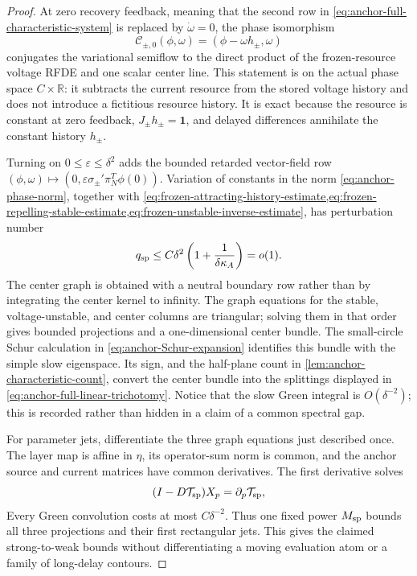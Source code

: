 \begin{proof}
At zero recovery feedback, meaning that the second row in
\cref{eq:anchor-full-characteristic-system} is replaced by
\(\dot\omega=0\), the phase isomorphism
\begin{equation}
 \mathcal C_{\pm,0}(\phi,\omega)
   =(\phi-\omega h_\pm,\omega)                         \label{eq:anchor-zero-feedback-phase-isomorphism}
\end{equation}
conjugates the variational semiflow to the direct product of the
frozen-resource voltage RFDE and one scalar center line.  This statement is
on the actual phase space \(C\times\mathbb R\): it subtracts the current
resource from the stored voltage history and does not introduce a fictitious
resource history.  It is exact because the resource is constant at zero
feedback, \(J_\pm h_\pm=\mathbf1\), and delayed differences annihilate the
constant history \(h_\pm\).

Turning on \(0\le\varepsilon\le\delta^2\) adds the bounded retarded
vector-field row
\((\phi,\omega)\mapsto(0,\varepsilon\sigma_\pm'\pi_N^T\phi(0))\).
Variation of constants in the norm
\cref{eq:anchor-phase-norm}, together with
\cref{eq:frozen-attracting-history-estimate,eq:frozen-repelling-stable-estimate,eq:frozen-unstable-inverse-estimate},
has perturbation number
\begin{equation}
 q_{\rm sp}
 \le C\delta^2
   \left(1+\frac{1}{\delta\kappa_A}\right)=o(1).  \label{eq:anchor-full-splitting-smallness}
\end{equation}
The center graph is obtained with a neutral boundary row rather than by
integrating the center kernel to infinity.  The graph equations for the
stable, voltage-unstable, and center columns are triangular; solving them
in that order gives bounded projections and a one-dimensional center
bundle.  The small-circle Schur calculation in
\cref{eq:anchor-Schur-expansion} identifies this bundle with the simple
slow eigenspace.  Its sign, and the half-plane count in
\cref{lem:anchor-characteristic-count}, convert the center bundle into the
splittings displayed in \cref{eq:anchor-full-linear-trichotomy}.  Notice
that the slow Green integral is \(O(\delta^{-2})\); this is recorded
rather than hidden in a claim of a common spectral gap.

For parameter jets, differentiate the three graph equations just described
once.
The layer map is affine in \(\eta\), its operator-sum norm is common, and
the anchor source and current matrices have common derivatives.  The first
derivative solves
\begin{equation}
 (I-D\mathcal T_{\rm sp})X_p
     =\partial_p\mathcal T_{\rm sp},                \label{eq:anchor-spectral-first-jet}
\end{equation}
Every Green convolution costs at most \(C\delta^{-2}\).  Thus one fixed
power \(M_{\rm sp}\) bounds all three projections and their first
rectangular jets.
This gives the claimed strong-to-weak bounds without differentiating a
moving evaluation atom or a family of long-delay contours.


\end{proof}
